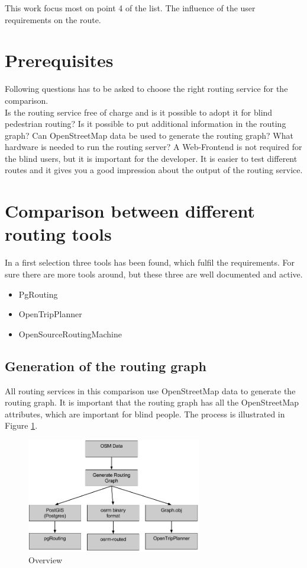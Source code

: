 \documentclass{sig-alternate}
\begin{document}
This work focus most on point 4 of the list. The influence of the user requirements on the route.  

\section{Prerequisites}
Following questions has to be asked to choose the right routing service for the comparison.\\
Is the routing service free of charge and is it possible to adopt it for blind pedestrian routing? Is it possible to put additional information in the routing graph? Can OpenStreetMap data be used to generate the routing graph? What hardware is needed to run the routing server? A Web-Frontend is not required for the blind users, but it is important for the developer. It is easier to test different routes and it gives you a good impression about the output of the routing service. 
\section{Comparison between different routing tools}
In a first selection three tools has been found, which fulfil the requirements. For sure there are more tools around, but these three are well documented and active.
\begin{itemize}
  \item PgRouting
  \item OpenTripPlanner
  \item OpenSourceRoutingMachine  
\end{itemize}

  
\subsection{Generation of the routing graph}

All routing services in this comparison use OpenStreetMap data to generate the routing graph. It is important that the routing graph has all the OpenStreetMap attributes, which are important for blind people. The process is illustrated in Figure \ref{fig:overview}.

\begin{figure}
\centering
\includegraphics[width=3in]{Overview2.png}
\caption{Overview}
\label{fig:overview}
\end{figure}
\end{document}
